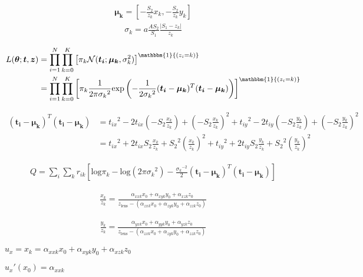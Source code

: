 \documentclass{article}
\begin{document}
\begin{align}
\bm{\mu_k} = \left[-\frac{S_2}{z_k} x_k, -\frac{S_2}{z_k} y_k\right]
\end{align}
\begin{align}
\sigma_k = a \frac{AS_2}{S_1} \frac{|S_1-z_k|}{z_k}
\end{align}


\begin{align}
L(\bm{\theta};\bm{t},\bm{z}) &= \prod_{i=1}^N \prod_{k=0}^K \left[ \pi_k \mathcal{N}(\bm{t_i};\bm{\mu_k},\sigma_k^2) \right]^{\mathbbm{1}{(z_i=k)}} \\
&= \prod_{i=1}^N \prod_{k=0}^K \left[ \pi_k \frac{1}{2\pi{\sigma_k}^2} \text{exp}\left( -\frac{1}{2{\sigma_k}^2} (\bm{t_i}-\bm{\mu_k})^T(\bm{t_i}-\bm{\mu_k}) \right) \right]^{\mathbbm{1}{(z_i=k)}}
\end{align}

\begin{align}
(\bm{t_i}-\bm{\mu_k})^T(\bm{t_i}-\bm{\mu_k}) &= {t_{ix}}^2 - 2t_{ix}\left(-S_2\frac{x_k}{z_{k}}\right) + \left(-S_2\frac{x_k}{z_{k}}\right)^2 + {t_{iy}}^2 - 2t_{iy}\left(-S_2\frac{y_k}{z_{k}}\right) + \left(-S_2\frac{y_k}{z_{k}}\right)^2 \\
&= {t_{ix}}^2 + 2t_{ix}S_2\frac{x_k}{z_{k}} + {S_2}^2\left(\frac{x_k}{z_{k}}\right)^2 + {t_{iy}}^2 + 2t_{iy}S_2\frac{y_k}{z_{k}} + {S_2}^2\left(\frac{y_k}{z_{k}}\right)^2
\end{align}


\begin{align}
Q = \sum_i \sum_k r_{ik} \left[ \text{log}\pi_k - \text{log}(2\pi{\sigma_k}^2) - \frac{{\sigma_k}^{-2}}{2}(\bm{t_i}-\bm{\mu_k})^T(\bm{t_i}-\bm{\mu_k}) \right]
\end{align}

\begin{align}
\frac{x_k}{z_k} = \frac{\alpha_{xxk}x_0 + \alpha_{xyk}y_0 + \alpha_{xzk}z_0}{z_\text{lens} - (\alpha_{zxk}x_0 + \alpha_{zyk}y_0 + \alpha_{zzk}z_0)}
\end{align}

\begin{align}
\frac{y_k}{z_k} = \frac{\alpha_{yxk}x_0 + \alpha_{yyk}y_0 + \alpha_{yzk}z_0}{z_\text{lens} - (\alpha_{zxk}x_0 + \alpha_{zyk}y_0 + \alpha_{zzk}z_0)}
\end{align}



$u_x = x_k = \alpha_{xxk}x_0 + \alpha_{xyk}y_0 + \alpha_{xzk}z_0$

${u_x}'(x_0) = \alpha_{xxk}$
\end{document}
